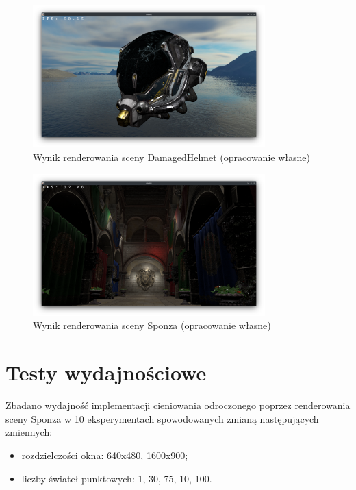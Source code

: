 \begin{figure}[!htb]
	\centering
	\includegraphics[width=0.8\textwidth]{images/render_damagedhelmet.png}
	\caption{Wynik renderowania sceny DamagedHelmet (opracowanie własne)}
	\label{screenshot_damagedhelmet}
\end{figure}

\begin{figure}[!htb]
	\centering
	\includegraphics[width=0.8\textwidth]{images/render_sponza.png}
	\caption{Wynik renderowania sceny Sponza (opracowanie własne)}
	\label{screenshot_sponza}
\end{figure}

\section{Testy wydajnościowe}

Zbadano wydajność implementacji cieniowania odroczonego poprzez renderowania sceny Sponza w 10 eksperymentach spowodowanych zmianą następujących zmiennych:
\begin{itemize}
	\item rozdzielczości okna: 640x480, 1600x900;
	\item liczby świateł punktowych: 1, 30, 75, 10, 100.
\end{itemize}

